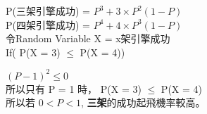 \documentclass{article}
\begin{document}
\fontsize{15pt}{20pt}\selectfont

\begin{CJK}{UTF8}{bsmi} %
\noindent
P(三架引擎成功) = $P^{3} + 3 \times P^{2}(1-P)$\\
P(四架引擎成功) = $P^{4} + 4 \times P^{3}(1-P) $\\

\noindent
令Random Variable X = x架引擎成功\\
If( P(X = 3) $\leq$ P(X = 4))

$(P-1)^{2} \leq 0$\\
所以只有 P = 1 時， P(X = 3) $\leq$ P(X = 4)\\

\noindent
所以若 $0 < P < 1$, \textbf{三架}的成功起飛機率較高。
	
\end{CJK} %
\end{document}
